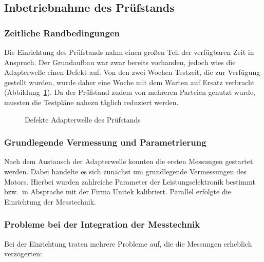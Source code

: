 \subsection{Inbetriebnahme des Prüfstands}
\label{sec:inbetriebnahme}

\subsubsection{Zeitliche Randbedingungen}
\label{subsec:zeitliche_randbedingungen}

Die Einrichtung des Prüfstands nahm einen großen Teil der verfügbaren Zeit in Anspruch. Der Grundaufbau war zwar bereits vorhanden, jedoch wies die Adapterwelle einen Defekt auf. Von den zwei Wochen Testzeit, die zur Verfügung gestellt wurden, wurde daher eine Woche mit dem Warten auf Ersatz verbracht (Abbildung~\ref{fig:adapterwelle}). Da der Prüfstand zudem von mehreren Parteien genutzt wurde, mussten die Testpläne nahezu täglich reduziert werden.

\begin{figure}[htbp]
    \centering
    \caption{Defekte Adapterwelle des Prüfstands}
    \label{fig:adapterwelle}
\end{figure}

\subsubsection{Grundlegende Vermessung und Parametrierung}
\label{subsec:grundvermessung}

Nach dem Austausch der Adapterwelle konnten die ersten Messungen gestartet werden. Dabei handelte es sich zunächst um grundlegende Vermessungen des Motors. Hierbei wurden zahlreiche Parameter der Leistungselektronik bestimmt bzw.\ in Absprache mit der Firma Unitek kalibriert. Parallel erfolgte die Einrichtung der Messtechnik.

\subsubsection{Probleme bei der Integration der Messtechnik}
\label{subsec:integrationsprobleme}

Bei der Einrichtung traten mehrere Probleme auf, die die Messungen erheblich verzögerten:

